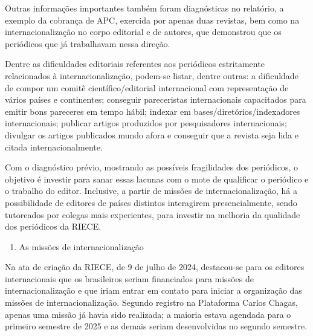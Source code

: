 \documentclass[
  a4paper,
]{book}
\providecommand{\tightlist}{%
  \setlength{\itemsep}{0pt}\setlength{\parskip}{0pt}}\usepackage{longtable,booktabs,array}
\begin{document}
Outras informações importantes também foram diagnósticas no relatório, a
exemplo da cobrança de APC, exercida por apenas duas revistas, bem como
na internacionalização no corpo editorial e de autores, que demonstrou
que os periódicos que já trabalhavam nessa direção.

Dentre as dificuldades editoriais referentes aos periódicos estritamente
relacionados à internacionalização, podem-se listar, dentre outras: a
dificuldade de compor um comitê científico/editorial internacional com
representação de vários países e continentes; conseguir pareceristas
internacionais capacitados para emitir bons pareceres em tempo hábil;
indexar em bases/diretórios/indexadores internacionais; publicar artigos
produzidos por pesquisadores internacionais; divulgar os artigos
publicados mundo afora e conseguir que a revista seja lida e citada
internacionalmente.

Com o diagnóstico prévio, mostrando as possíveis fragilidades dos
periódicos, o objetivo é investir para sanar essas lacunas com o mote de
qualificar o periódico e o trabalho do editor. Inclusive, a partir de
missões de internacionalização, há a possibilidade de editores de países
distintos interagirem presencialmente, sendo tutoreados por colegas mais
experientes, para investir na melhoria da qualidade dos periódicos da
RIECE.

\begin{enumerate}
\def\labelenumi{\arabic{enumi}.}
\setcounter{enumi}{1}
\tightlist
\item
  As missões de internacionalização
\end{enumerate}

Na ata de criação da RIECE, de 9 de julho de 2024, destacou-se para os
editores internacionais que os brasileiros seriam financiados para
missões de internacionalização e que iriam entrar em contato para
iniciar a organização das missões de internacionalização. Segundo
registro na Plataforma Carlos Chagas, apenas uma missão já havia sido
realizada; a maioria estava agendada para o primeiro semestre de 2025 e
as demais seriam desenvolvidas no segundo semestre.
\end{document}
